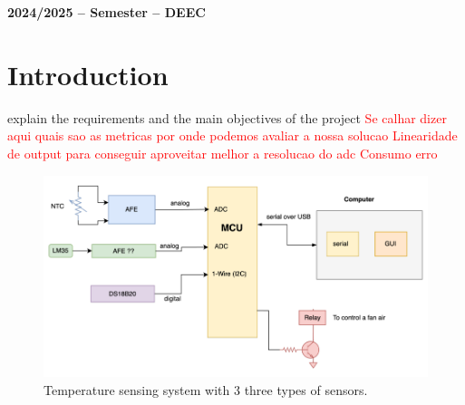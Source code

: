 \documentclass[12pt]{article}
\begin{document}

\vspace{6cm}

\begin{center}
    \large \bf 2024/2025 --  Semester -- DEEC
\end{center}

\thispagestyle{empty}

\setcounter{page}{0}

\newpage

\newpage

\tableofcontents %

\newpage

\listoffigures

\newpage

\section{Introduction}
explain the requirements and the main objectives of the project
\textcolor{red}{
    Se calhar dizer aqui quais sao as metricas por onde podemos avaliar a nossa solucao
    Linearidade de output para conseguir aproveitar melhor a resolucao do adc 
    Consumo
    erro}

    \begin{figure}[H] 
        \centering
        \includegraphics*[scale = 0.5]{images/system-design.png}
        \caption{Temperature sensing system with 3 three types of sensors.}
        \label{wrap-fig:1}
    \end{figure}

\pagebreak
\end{document}

